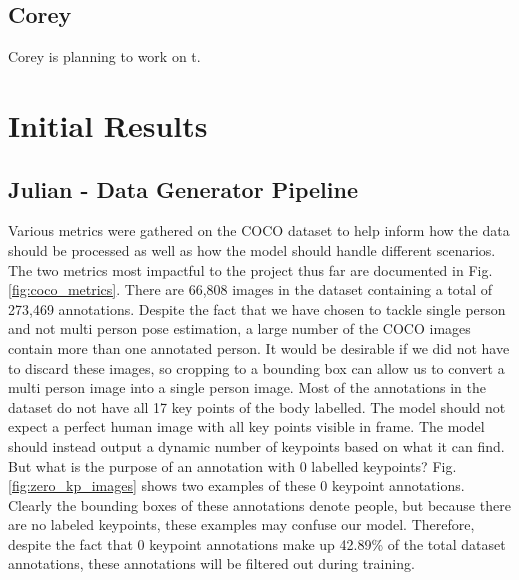 \documentclass[11pt, letterpaper]{article}
\begin{document}
\subsection{Corey}
Corey is planning to work on t. 

\section{Initial Results}
\label{SectionInitialResults}

\subsection{Julian - Data Generator Pipeline}

Various metrics were gathered on the COCO dataset to help inform how the data should be processed as well as how the model should handle different scenarios. The two metrics most impactful to the project thus far are documented in Fig. \ref{fig:coco_metrics}. There are 66,808 images in the dataset containing a total of 273,469 annotations. Despite the fact that we have chosen to tackle single person and not multi person pose estimation, a large number of the COCO images contain more than one annotated person. It would be desirable if we did not have to discard these images, so cropping to a bounding box can allow us to convert a multi person image into a single person image. Most of the annotations in the dataset do not have all 17 key points of the body labelled. The model should not expect a perfect human image with all key points visible in frame. The model should instead output a dynamic number of keypoints based on what it can find. But what is the purpose of an annotation with 0 labelled keypoints? Fig. \ref{fig:zero_kp_images} shows two examples of these 0 keypoint annotations. Clearly the bounding boxes of these annotations denote people, but because there are no labeled keypoints, these examples may confuse our model. Therefore, despite the fact that 0 keypoint annotations make up 42.89\% of the total dataset annotations, these annotations will be filtered out during training.
\end{document}
